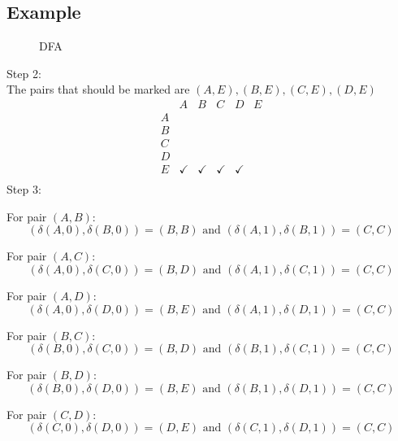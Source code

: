 \documentclass{article}
\begin{document}
\subsection{Example} \label{sec:minimisation-example}
\begin{figure}[H]
\centering %
\caption{DFA}
\label{fig:my_label}
\end{figure}
Step 2:\\
The pairs that should be marked are $(A,E),(B,E),(C,E),(D,E)$
$$
\begin{array}{c|ccccc}
  & A & B & C & D & E  \\
\hline
A &           &  &        &        &               \\
B &           & & &        &            \\
C &           &           &  &  &               \\
D &           &           &           &  &       \\
E & \checkmark          & \checkmark          &   \checkmark        &  \checkmark         &   \\
\end{array}
$$
Step 3:

For pair $(A,B)$:
$$
(\delta(A,0),\delta(B,0))=(B,B) \text{ and } (\delta(A,1),\delta(B,1))=(C,C)
$$

For pair $(A,C)$:
$$
(\delta(A,0),\delta(C,0))=(B,D) \text{ and } (\delta(A,1),\delta(C,1))=(C,C)
$$

For pair $(A,D)$:
$$
(\delta(A,0),\delta(D,0))=(B,E) \text{ and } (\delta(A,1),\delta(D,1))=(C,C)
$$

For pair $(B,C)$:
$$
(\delta(B,0),\delta(C,0))=(B,D) \text{ and } (\delta(B,1),\delta(C,1))=(C,C)
$$

For pair $(B,D)$:
$$
(\delta(B,0),\delta(D,0))=(B,E) \text{ and } (\delta(B,1),\delta(D,1))=(C,C)
$$

For pair $(C,D)$:
$$
(\delta(C,0),\delta(D,0))=(D,E) \text{ and } (\delta(C,1),\delta(D,1))=(C,C)
$$
\end{document}
